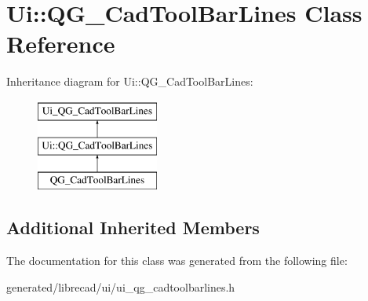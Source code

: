 \hypertarget{classUi_1_1QG__CadToolBarLines}{\section{Ui\-:\-:Q\-G\-\_\-\-Cad\-Tool\-Bar\-Lines Class Reference}
\label{classUi_1_1QG__CadToolBarLines}
}
Inheritance diagram for Ui\-:\-:Q\-G\-\_\-\-Cad\-Tool\-Bar\-Lines\-:\begin{figure}[H]
\begin{center}
\leavevmode
\includegraphics[height=3.000000cm]{classUi_1_1QG__CadToolBarLines}
\end{center}
\end{figure}
\subsection*{Additional Inherited Members}


The documentation for this class was generated from the following file\-:\begin{DoxyCompactItemize}
\item 
generated/librecad/ui/ui\-\_\-qg\-\_\-cadtoolbarlines.\-h\end{DoxyCompactItemize}
